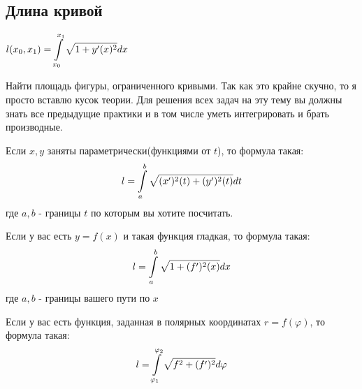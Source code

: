 \subsection{Длина кривой}

$l (x_0,x_1) = \displaystyle\int\limits_{x_0}^{x_1}\sqrt{1+y'(x)^2}dx$

Найти площадь фигуры, ограниченного кривыми. Так как это крайне скучно, то я просто вставлю кусок теории. Для решения всех задач на эту тему вы должны знать все предыдущие практики и в том числе уметь интегрировать и брать производные.

Если $x,y$ заняты параметрически(функциями от $t$), то формула такая:
$$l  = \displaystyle\int\limits_{a}^{b} \sqrt{(x')^2(t) + (y')^2(t)}dt$$
где $a,b$ - границы $t$ по которым вы хотите посчитать.

Если у вас есть $y = f(x)$ и такая функция гладкая, то формула такая:
$$l = \displaystyle\int\limits_{a}^{b}\sqrt{1+(f')^2(x)}dx$$
где $a,b$ - границы вашего пути по $x$

Если у вас есть функция, заданная в полярных координатах $r = f(\varphi)$, то формула такая:
$$l= \displaystyle\int\limits_{\varphi_1}^{\varphi_2}\sqrt{f^2 +(f')^2}d\varphi$$